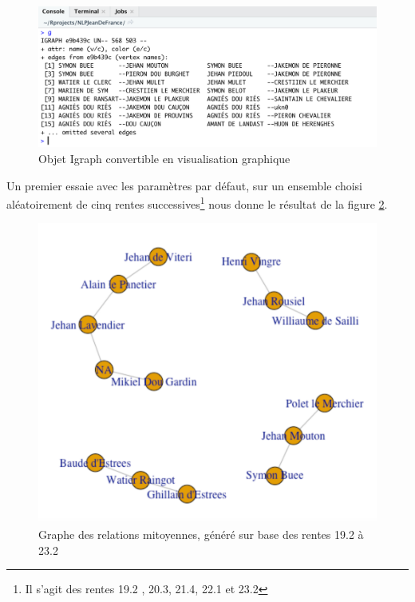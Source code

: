 \begin{figure}[h]
    \centering
    \includegraphics[scale=0.50]{3.Results/Img/igraph_object.png}
    \caption{Objet Igraph convertible en visualisation graphique}
    \label{fig:objetIgraph}
\end{figure}

Un premier essaie avec les paramètres par défaut, sur un ensemble choisi aléatoirement de cinq rentes successives\footnote{Il s'agit des rentes 19.2 , 20.3, 21.4, 22.1 et 23.2 } nous donne le résultat de la figure  \ref{fig:test_graphe}.

\begin{figure}[h]
    \centering
    \includegraphics[scale=0.45]{3.Results/Img/graphe_test.png}
    \caption{Graphe des relations mitoyennes, généré sur base des rentes 19.2 à 23.2 }
    \label{fig:test_graphe}
\end{figure}

